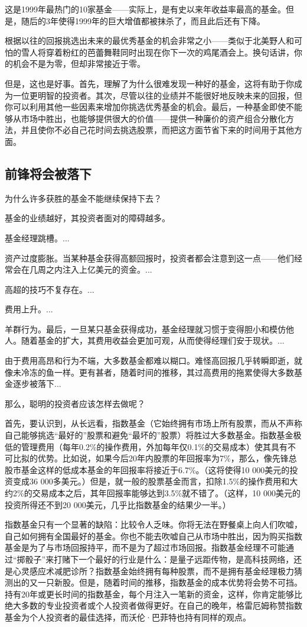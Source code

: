 \documentclass[12pt,oneside]{book}
\begin{document}
这是1999年最热门的10家基金——实际上，是有史以来年收益率最高的基金。但是，随后的3年使得1999年的巨大增值都被抹杀了，而且此后还有下降。

根据以往的回报挑选出未来的最优秀基金的机会非常之小——类似于北美野人和可怕的雪人将穿着粉红的芭蕾舞鞋同时出现在你下一次的鸡尾酒会上。换句话讲，你的机会不是为零，但却非常接近于零。

但是，这也是好事。首先，理解了为什么很难发现一种好的基金，这将有助于你成为一位更明智的投资者。其次，尽管以往的业绩并不能很好地反映未来的回报，但你可以利用其他一些因素来增加你挑选优秀基金的机会。最后，一种基金即使不能够从市场中胜出，也能够提供很大的价值——提供一种廉价的资产组合分散化方法，并且使你不必自己花时间去挑选股票，而把这方面节省下来的时间用于其他方面。

\subsection{前锋将会被落下}
为什么许多获胜的基金不能继续保持下去？

基金的业绩越好，其投资者面对的障碍越多。

基金经理跳槽。...

资产过度膨胀。当某种基金获得高额回报时，投资者都会注意到这一点——他们经常会在几周之内注入上亿美元的资金。...

高超的技巧不复存在。...

费用上升。...

羊群行为。最后，一旦某只基金获得成功，基金经理就习惯于变得胆小和模仿他人。随着基金的扩大，其费用收益会更加可观，从而使得经理们安于现状。...

由于费用高昂和行为不端，大多数基金都难以糊口。难怪高回报几乎转瞬即逝，就像未冷冻的鱼一样。更有甚者，随着时间的推移，其过高费用的拖累使得大多数基金逐步被落下...

那么，聪明的投资者应该怎样去做呢？

首先，要认识到，从长远看，指数基金（它始终拥有市场上所有股票，而从不声称自己能够挑选“最好的”股票和避免“最坏的”股票）将胜过大多数基金。指数基金极低的管理费用（每年0.2\%的操作费用，外加每年仅0.1\%的交易成本）使其具有不可比拟的优势。比如说，如果今后20年内股票的年回报率为7\%，那么，像先锋总股市基金这样的低成本基金的年回报率将接近于6.7\%。（这将使得10 000美元的投资变成36 000多美元。）但是，就一般的股票基金而言，扣除1.5\%的操作费用和大约2\%的交易成本之后，其年回报率能够达到3.5\%就不错了。（这样，10 000美元的投资所得还不到20 000美元，几乎比指数基金的结果少一半。）

指数基金只有一个显著的缺陷：比较令人乏味。你将无法在野餐桌上向人们吹嘘，自己如何拥有全国最好的基金。你也不能去吹嘘自己从市场中胜出，因为购买指数基金是为了与市场回报持平，而不是为了超过市场回报。指数基金经理不可能通过“掷骰子”来打赌下一个最好的行业是什么：是量子远距传物，是高科技网络，还是心灵感应术减肥诊所？指数基金始终拥有每种股票，而不是拥有基金经理极力猜测出的又一只新股。但是，随着时间的推移，指数基金的成本优势将会势不可挡。持有20年或更长时间的指数基金，每个月注入一笔新的资金，这样，你肯定能够比绝大多数的专业投资者或个人投资者做得更好。在自己的晚年，格雷厄姆称赞指数基金为个人投资者的最佳选择，而沃伦·巴菲特也持有同样的观点。
\end{document}
